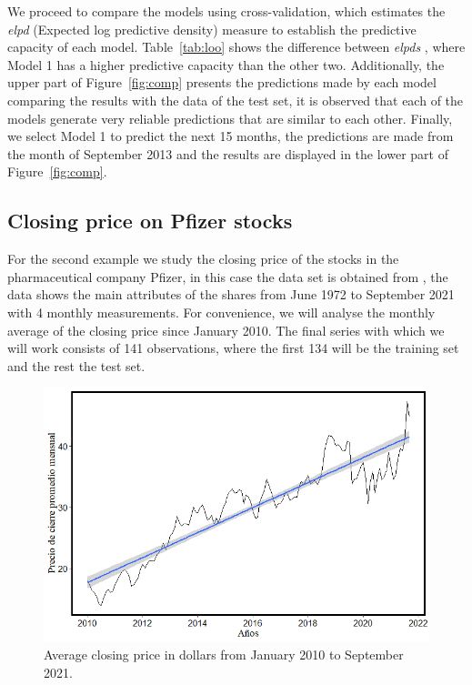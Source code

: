 We proceed to compare the models using cross-validation, which estimates the \textit{elpd} (Expected log predictive density) measure to establish the predictive capacity of each model. Table~\ref{tab:loo} shows the difference between \textit{elpds} , where Model 1 has a higher predictive capacity than the other two. Additionally, the upper part of Figure~\ref{fig:comp} presents the predictions made by each model comparing the results with the data of the test set, it is observed that each of the models generate very reliable predictions that are similar to each other. Finally, we select Model 1 to predict the next 15 months, the predictions are made from the month of September 2013 and the results are displayed in the lower part of Figure~\ref{fig:comp}.
%
\subsection{Closing price on Pfizer stocks}
For the second example we study the closing price of the stocks in the pharmaceutical company Pfizer, in this case the data set is obtained from \citet{kaggle}, the data shows the main attributes of the shares from June 1972 to September 2021 with 4 monthly measurements. For convenience, we will analyse the monthly average of the closing price since January 2010. The final series with which we will work consists of 141 observations, where the first 134 will be the training set and the rest the test set.
%
\begin{figure}
	\centering
	\includegraphics[scale=0.5]{Figs/a}
	\caption{Average closing price in dollars from January 2010 to September 2021.}
	\label{fig:clousure}
\end{figure}
